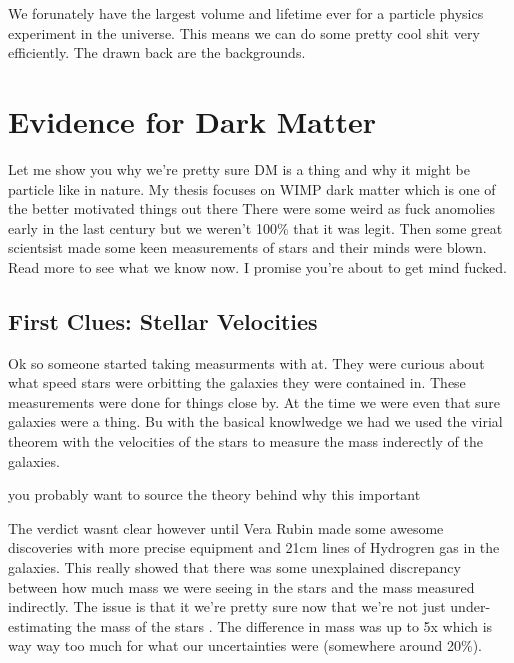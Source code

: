We forunately have the largest volume and lifetime ever for a particle physics experiment in the universe.
This means we can do some pretty cool shit very efficiently.
The drawn back are the backgrounds.

\section{Evidence for Dark Matter\label{sec:evidence4dm}}

Let me show you why we're pretty sure DM is a thing and why it might be particle like in nature.
My thesis focuses on WIMP dark matter which is one of the better motivated things out there
There were some weird as fuck anomolies early in the last century but we weren't 100\% that it was legit.
Then some great scientsist made some keen measurements of stars and their minds were blown.
Read more to see what we know now.
I promise you're about to get mind fucked.

\subsection{First Clues: Stellar Velocities\label{sec:ev4dm_stars}}
Ok so someone \fu \ns started taking measurments with at.
They were curious about what speed stars were orbitting the galaxies they were contained in.
These measurements were done for things close by.
At the time we were even that sure galaxies were a thing.
Bu with the basical knowlwedge we had we used the virial theorem with the velocities of the stars to measure the mass inderectly of the galaxies.


\ns you probably want to source the theory behind why this important

The verdict wasnt clear however until Vera Rubin made some awesome discoveries with more precise equipment and 21cm lines of Hydrogren gas in the galaxies.
This really showed that there was some unexplained discrepancy between how much mass we were seeing in the stars and the mass measured indirectly.
The issue is that it we're pretty sure now that we're not just under-estimating the mass of the stars \ns.
The difference in mass was up to 5x which is way way too much for what our uncertainties were (somewhere around 20\%)\ns.


